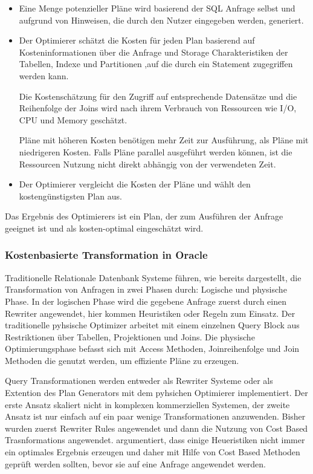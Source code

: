 \begin{itemize}
\item Eine Menge potenzieller Pläne wird basierend der SQL Anfrage selbst und aufgrund von Hinweisen, die durch den Nutzer eingegeben werden, generiert.

\item Der Optimierer schätzt die Kosten für jeden Plan basierend auf Kosteninformationen über die Anfrage und Storage Charakteristiken der Tabellen, Indexe und Partitionen ,auf die durch ein Statement zugegriffen werden kann.

Die Kostenschätzung für den Zugriff auf entsprechende Datensätze und die Reihenfolge der Joins wird nach ihrem Verbrauch von Ressourcen wie I/O, CPU und Memory geschätzt.

Pläne mit höheren Kosten benötigen mehr Zeit zur Ausführung, als Pläne mit niedrigeren Kosten. Falls Pläne parallel ausgeführt werden können, ist die Ressourcen Nutzung nicht direkt abhängig von der verwendeten Zeit.

\item Der Optimierer vergleicht die Kosten der Pläne und wählt den kostengünstigsten Plan aus.
\end{itemize}

Das Ergebnis des Optimierers ist ein Plan, der zum Ausführen der Anfrage geeignet ist und als kosten-optimal eingeschätzt wird.


\subsubsection{Kostenbasierte Transformation in Oracle}

Traditionelle Relationale Datenbank Systeme führen, wie bereits dargestellt, die Transformation von Anfragen in zwei Phasen durch: Logische und physische Phase. In der logischen Phase wird die gegebene Anfrage zuerst durch einen Rewriter angewendet, hier kommen Heuristiken oder Regeln zum Einsatz. Der traditionelle pyhsische Optimizer arbeitet mit einem einzelnen Query Block aus Restriktionen über Tabellen, Projektionen und Joins. Die physische Optimierungsphase befasst sich mit Access Methoden, Joinreihenfolge und Join Methoden die genutzt werden, um effiziente Pläne zu erzeugen.

Query Transformationen werden entweder als Rewriter Systeme oder als Extention des Plan Generators mit dem pyhsichen Optimierer implementiert. Der erste Ansatz skaliert nicht in komplexen kommerziellen Systemen, der zweite Ansatz ist nur einfach auf ein paar wenige Transformationen anzuwenden. 
Bisher wurden zuerst Rewriter Rules angewendet und dann die Nutzung von Cost Based Trasnformations angewendet. \cite{ahmed2006cost} argumentiert, dass einige Heueristiken nicht immer ein optimales Ergebnis erzeugen und daher mit Hilfe von Cost Based Methoden geprüft werden sollten, bevor sie auf eine Anfrage angewendet werden.


